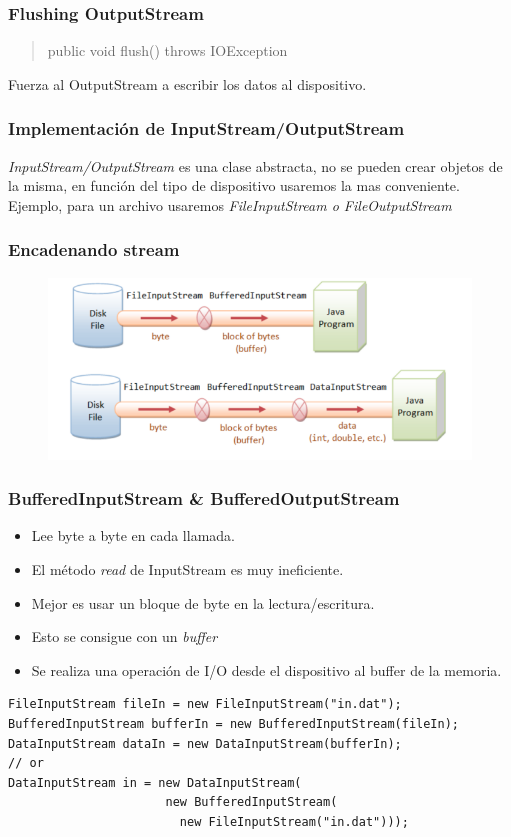 \documentclass{beamer}
\begin{document}
\begin{frame}[fragile]
\frametitle{Flushing  OutputStream}
\begin{quote}
public void flush() throws IOException 
\end{quote}
Fuerza al OutputStream a escribir los datos al dispositivo.
\end{frame}

\begin{frame}[fragile]
\frametitle{Implementación de InputStream/OutputStream}
\emph{InputStream/OutputStream} es una clase abstracta, no se pueden crear objetos de la misma, en función del tipo de dispositivo usaremos la mas conveniente.\\
Ejemplo, para un archivo usaremos \emph{FileInputStream o FileOutputStream}
\end{frame}

\begin{frame}
\frametitle{Encadenando stream}
\begin{figure}
\includegraphics[scale=0.6]{imagenes/encadenado.png}
\end{figure}
\end{frame}

\begin{frame}[fragile]
\frametitle{BufferedInputStream \& BufferedOutputStream}
\begin{itemize}[<+->]
\item Lee byte a byte en cada llamada.
\item El método \emph{read} de InputStream es muy ineficiente.
\item Mejor es usar un bloque de byte en la lectura/escritura.
\item Esto se consigue con un \emph{buffer}
\item Se realiza una operación de I/O desde el dispositivo al buffer de la memoria.
\end{itemize}
\pause
\begin{small}
\begin{verbatim}
FileInputStream fileIn = new FileInputStream("in.dat");
BufferedInputStream bufferIn = new BufferedInputStream(fileIn);
DataInputStream dataIn = new DataInputStream(bufferIn);
// or
DataInputStream in = new DataInputStream(
                      new BufferedInputStream(
                        new FileInputStream("in.dat")));
\end{verbatim}
\end{small}
\end{frame}
\end{document}
